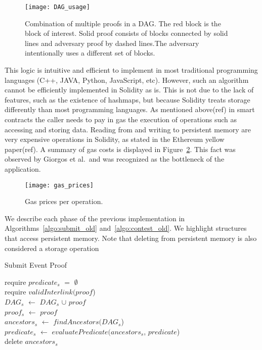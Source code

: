 \begin{figure}[hbt]
    \centering
    \texttt{[image: DAG\_usage]}
    \caption{Combination of multiple proofs in a DAG. The red block is the
        block of interest. Solid proof consists of blocks connected by solid
        lines and adversary proof by dashed lines.The adversary intentionally
        uses a different set of blocks.}
    \label{fig:DAG_usage}
\end{figure}

This logic is intuitive and efficient to implement in most traditional
programming languages (C++, JAVA, Python, JavaScript, etc). However, such an
algorithm cannot be efficiently implemented in Solidity as is. This is not
due to the lack of features, such as the existence of hashmaps, but because
Solidity treats storage differently than most programming languages. As
mentioned above(ref) in smart contracts the caller needs to pay in gas the
execution of operations such as accessing and storing data. Reading from and
writing to persistent memory are very expensive operations in Solidity, as
stated in the Ethereum yellow paper(ref). A summary of gas costs is displayed
in Figure~\ref{fig:gas_prices}. This fact was observed by Giorgos et al.\ and
was recognized as the bottleneck of the application.

\begin{figure}[hbt]
    \centering
    \texttt{[image: gas\_prices]}
    \caption{Gas prices per operation.}
    \label{fig:gas_prices}
\end{figure}

We describe each phase of the previous implementation in
Algorithms~\ref{algo:submit_old} and~\ref{algo:contest_old}. We highlight
structures that access persistent memory. Note that deleting from persistent
memory is also considered a storage operation

\begin{algorithm}
    \caption{Submit Event Proof}
    \label{algo:submit_old}
    require $predicate_{s}$ $=$ $\emptyset$ \\
    require $validInterlink(proof$) \\
    $DAG_{s}$ $\leftarrow$ $DAG_{s}$ $\cup$ $proof$\\
    $proof_{s}$ $\leftarrow$ $proof$\\
    $ancestors_{s}$ $\leftarrow$ $findAncestors(DAG_{s}$)\\
    $predicate_{s}$ $\leftarrow$ $evaluatePredicate(ancestors_{s}$,
    $predicate$)\\
    delete $ancestors_{s}$\\
\end{algorithm}

